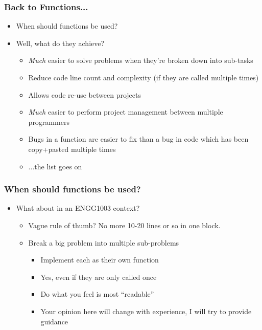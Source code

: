 \documentclass[14pt]{beamer}
\begin{document}
\begin{frame}
\frametitle{Back to Functions...}
\begin{itemize}
\item When should functions be used?
\pause
\item Well, what do they achieve?
	\begin{itemize}
		\item \textit{Much} easier to solve problems when they're broken down into sub-tasks
		\item Reduce code line count and complexity (if they are called multiple times)
		\item Allows code re-use between projects
		\item \textit{Much} easier to perform project management between multiple programmers
		\item Bugs in a function are easier to fix than a bug in code which has been copy+pasted multiple times
		\item ...the list goes on
	\end{itemize}
\end{itemize}
\end{frame}

\begin{frame}
\frametitle{When should functions be used?}
\begin{itemize}
\item What about in an ENGG1003 context?
\pause
	\begin{itemize}
		\item Vague rule of thumb? No more 10-20 lines or so in one block.
		\item Break a big problem into multiple sub-problems
			\begin{itemize}
				\item Implement each as their own function
				\pause
				\item Yes, even if they are only called once
				\pause
				\item Do what you feel is most ``readable''
				\pause
				\item Your opinion here will change with experience, I will try to provide guidance
			\end{itemize}
	\end{itemize}
\end{itemize}
\end{frame}
\end{document}
